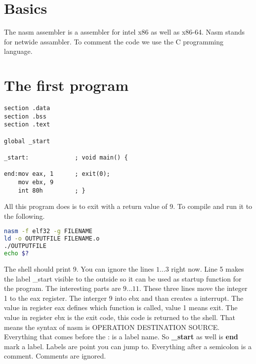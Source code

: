 \section{Basics}
The nasm assembler is a assembler for intel x86 as well as x86-64. Nasm stands
for netwide assambler. To comment the code we use the C programming language.

\section{The first program}
\lstset{basicstyle=\scriptsize, numbers=left, captionpos=b, tabsize=4}
\begin{lstlisting}[caption=First nasm program,language={[x86masm]Assembler},
xleftmargin=20pt, label=lst:firstNamsProgram]
section .data
section .bss
section .text

global _start

_start:				; void main() {

end:mov eax, 1		; exit(0);
	mov ebx, 9
	int 80h			; }
\end{lstlisting}
All this program does is to exit with a return value of 9. To compile and run
it to the following.
\begin{lstlisting}[language=bash,numbers=none]
nasm -f elf32 -g FILENAME
ld -o OUTPUTFILE FILENAME.o
./OUTPUTFILE
echo $?
\end{lstlisting}
The shell should print 9. You can ignore the lines $1 \dots 3$ right now. Line
5 makes the label \_start visible to the outside so it can be used as startup
function for the program. The interesting parts are $9 \dots 11$. These three
lines move the integer 1 to the eax register. The interger 9 into ebx and than
creates a interrupt. The value in register eax defines which function is
called, value 1 means exit. The value in register ebx is the exit code, this
code is returned to the shell. That means the syntax of nasm is OPERATION
DESTINATION SOURCE. Everything that comes before the : is a label name. So
\textbf{\_start} as well is \textbf{end} mark a label. Labels are point you can
jump to. Everything after a semicolon is a comment. Comments are ignored. 
